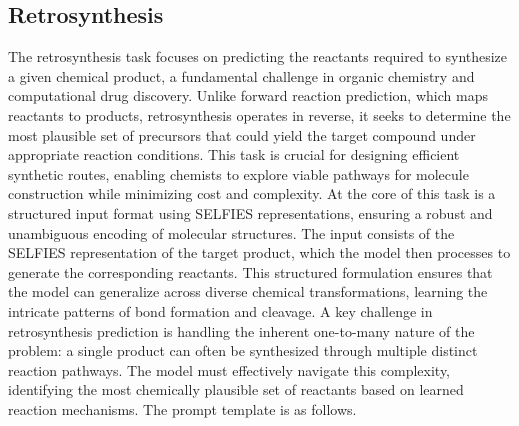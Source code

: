\subsection{Retrosynthesis}
The retrosynthesis task focuses on predicting the reactants required to synthesize a given chemical product, a fundamental challenge in organic chemistry and computational drug discovery. Unlike forward reaction prediction, which maps reactants to products, retrosynthesis operates in reverse, it seeks to determine the most plausible set of precursors that could yield the target compound under appropriate reaction conditions. This task is crucial for designing efficient synthetic routes, enabling chemists to explore viable pathways for molecule construction while minimizing cost and complexity. At the core of this task is a structured input format using SELFIES representations, ensuring a robust and unambiguous encoding of molecular structures. The input consists of the SELFIES representation of the target product, which the model then processes to generate the corresponding reactants. This structured formulation ensures that the model can generalize across diverse chemical transformations, learning the intricate patterns of bond formation and cleavage. A key challenge in retrosynthesis prediction is handling the inherent one-to-many nature of the problem: a single product can often be synthesized through multiple distinct reaction pathways. The model must effectively navigate this complexity, identifying the most chemically plausible set of reactants based on learned reaction mechanisms. The prompt template is as follows.


